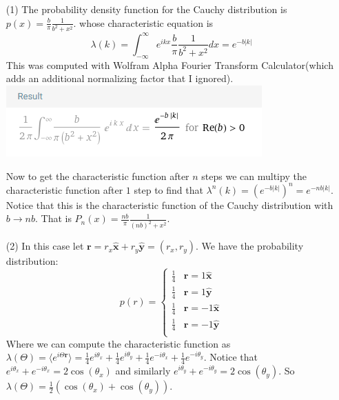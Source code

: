 \documentclass[12pt]{amsart}
\theoremstyle{definition}
\newcommand{\ra}{\rightarrow}
\newcommand{\ip}[1]{\langle#1\rangle}
\begin{document}
\begin{itemize}
\item[(1)] The probability density function for the Cauchy distribution is $p(x)=\frac{b}{\pi}\frac{1}{b^2+x^2}$. whose characteristic equation is 
$$\lambda(k)=\int_{-\infty}^{\infty}e^{ikx}\frac{b}{\pi}\frac{1}{b^2+x^2}dx=e^{-b|k|}$$ This was computed with Wolfram Alpha Fourier Transform Calculator(which adds an additional normalizing factor that I ignored).\\
\includegraphics[scale=.5]{rw-p1-int.png}

Now to get the characteristic function after $n$ steps we can multipy the characteristic function after $1$ step to find that $\lambda^n(k)=\left(e^{-b|k|}\right)^n=e^{-nb|k|}$. Notice that this is the characteristic function of the Cauchy distribution with $b\ra nb$. That is $P_n(x)=\frac{nb}{\pi}\frac{1}{(nb)^2+x^2}$.\\

\item[(2)] In this case let $\textbf{r}=r_x{\hat{\textbf{x}}}+r_y{\hat{\textbf{y}}}=(r_x,r_y)$. We have the probability distribution:
$$p(r)=\begin{cases}
    \frac{1}{4} & \textbf{r}=1{\hat{\textbf{x}}}\\
    \frac{1}{4} & \textbf{r}=1{\hat{\textbf{y}}}\\
    \frac{1}{4} & \textbf{r}=-1{\hat{\textbf{x}}}\\
    \frac{1}{4} & \textbf{r}=-1{\hat{\textbf{y}}}\\
\end{cases}$$
Where we can compute the characteristic function as 
$\lambda(\Theta)=\ip{e^{i\Theta \textbf{r}}}=\frac{1}{4}e^{i\theta_x}+\frac{1}{4}e^{i\theta_y}+\frac{1}{4}e^{-i\theta_x}+\frac{1}{4}e^{-i\theta_y}$. Notice that $e^{i\theta_x}+e^{-i\theta_x}=2\cos(\theta_x)$ and similarly $e^{i\theta_y}+e^{-i\theta_y}=2\cos(\theta_y)$. So $\lambda(\Theta)=\frac{1}{2}(\cos(\theta_x)+\cos(\theta_y))$.\\


\end{itemize}
\end{document}

